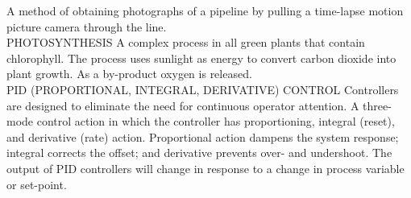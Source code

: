 \documentclass{article}
\begin{document}
A method of obtaining photographs of a pipeline by pulling a time-lapse motion picture camera through the line. 
\vspace{0.3cm}\\
PHOTOSYNTHESIS
A complex process in all green plants that contain chlorophyll. The process uses sunlight as energy to convert carbon dioxide into plant growth. As a by-product oxygen is released.
\vspace{0.3cm}\\
PID (PROPORTIONAL, INTEGRAL, DERIVATIVE) CONTROL
Controllers are designed to eliminate the need for continuous operator attention. A three-mode control action in which the controller has proportioning, integral (reset), and derivative (rate) action. Proportional action dampens the system response; integral corrects the offset; and derivative prevents over- and undershoot.  The output of PID controllers will change in response to a change in process variable or set-point.
\vspace{0.3cm}\\
\end{document}
